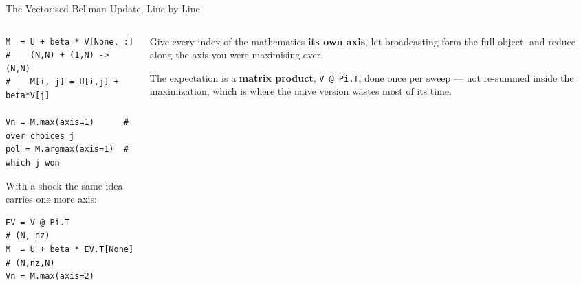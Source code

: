 \begin{frame}[fragile]{The Vectorised Bellman Update, Line by Line}
\begin{columns}[T]
\begin{column}{0.52\textwidth}
\begin{lstlisting}
M  = U + beta * V[None, :]
#    (N,N) + (1,N) -> (N,N)
#    M[i, j] = U[i,j] + beta*V[j]

Vn = M.max(axis=1)      # over choices j
pol = M.argmax(axis=1)  # which j won
\end{lstlisting}
\vspace{-1mm}
\small
With a shock the same idea carries one more axis:
\vspace{-1mm}
\begin{lstlisting}
EV = V @ Pi.T                # (N, nz)
M  = U + beta * EV.T[None]   # (N,nz,N)
Vn = M.max(axis=2)
\end{lstlisting}
\end{column}
\begin{column}{0.45\textwidth}
\begin{takeawaybox}[title=\textbf{The recipe}]\small
Give every index of the mathematics \textbf{its own axis}, let broadcasting form the full object, and reduce along the axis you were maximising over.
\end{takeawaybox}
\medskip
\begin{examplebox}\footnotesize
The expectation is a \textbf{matrix product}, \texttt{V @ Pi.T}, done once per sweep --- not re-summed inside the maximization, which is where the naive version wastes most of its time.
\end{examplebox}
\end{column}
\end{columns}
\end{frame}

